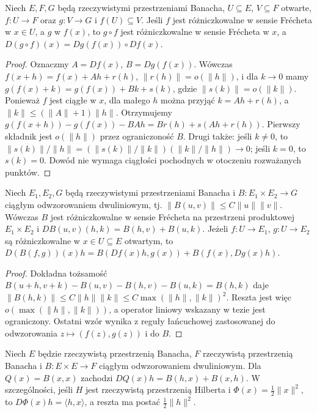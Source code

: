 \begin{twierdzenie}
\label{thm:chain14}
Niech $E,F,G$ będą rzeczywistymi przestrzeniami Banacha, $U\subseteq E$, $V\subseteq F$ otwarte, $f:U\to F$ oraz $g:V\to G$ i $f(U)\subseteq V$. Jeśli $f$ jest różniczkowalne w sensie Frécheta w $x\in U$, a $g$ w $f(x)$, to $g\circ f$ jest różniczkowalne w sensie Frécheta w $x$, a
$D(g\circ f)(x)=Dg(f(x))\circ Df(x)$.
\end{twierdzenie}
\begin{proof}
Oznaczmy $A=Df(x)$, $B=Dg(f(x))$. Wówczas $f(x+h)=f(x)+Ah+r(h)$, $\|r(h)\|=o(\|h\|)$, i dla $k\to0$ mamy $g(f(x)+k)=g(f(x))+Bk+s(k)$, gdzie $\|s(k)\|=o(\|k\|)$. Ponieważ $f$ jest ciągłe w $x$, dla małego $h$ można przyjąć $k=Ah+r(h)$, a $\|k\|\le(\|A\|+1)\|h\|$. Otrzymujemy
$g(f(x+h))-g(f(x))-BAh=Br(h)+s(Ah+r(h))$.
Pierwszy składnik jest $o(\|h\|)$ przez ograniczoność $B$. Drugi także: jeśli $k\ne0$, to
$\|s(k)\|/\|h\|=(\|s(k)\|/\|k\|)(\|k\|/\|h\|)\to0$;
jeśli $k=0$, to $s(k)=0$. Dowód nie wymaga ciągłości pochodnych w otoczeniu rozważanych punktów.
\end{proof}

\begin{twierdzenie}
\label{thm:bilinear14}
Niech $E_1,E_2,G$ będą rzeczywistymi przestrzeniami Banacha i $B:E_1\times E_2\to G$ ciągłym odwzorowaniem dwuliniowym, tj. $\|B(u,v)\|\le C\|u\|\|v\|$. Wówczas $B$ jest różniczkowalne w sensie Frécheta na przestrzeni produktowej $E_1\times E_2$ i
$DB(u,v)(h,k)=B(h,v)+B(u,k)$.
Jeżeli $f:U\to E_1$, $g:U\to E_2$ są różniczkowalne w $x\in U\subseteq E$ otwartym, to
$D(B(f,g))(x)h=B(Df(x)h,g(x))+B(f(x),Dg(x)h)$.
\end{twierdzenie}
\begin{proof}
Dokładna tożsamość
$B(u+h,v+k)-B(u,v)-B(h,v)-B(u,k)=B(h,k)$
daje $\|B(h,k)\|\le C\|h\|\|k\|\le C\max(\|h\|,\|k\|)^2$. Reszta jest więc $o(\max(\|h\|,\|k\|))$, a operator liniowy wskazany w tezie jest ograniczony. Ostatni wzór wynika z reguły łańcuchowej zastosowanej do odwzorowania $z\mapsto(f(z),g(z))$ i do $B$.
\end{proof}

\begin{przyklad}
\label{ex:quadratic14}
Niech $E$ będzie rzeczywistą przestrzenią Banacha, $F$ rzeczywistą przestrzenią Banacha i $B:E\times E\to F$ ciągłym odwzorowaniem dwuliniowym. Dla $Q(x)=B(x,x)$ zachodzi
$DQ(x)h=B(h,x)+B(x,h)$.
W szczególności, jeśli $H$ jest rzeczywistą przestrzenią Hilberta i $\Phi(x)=\frac12\|x\|^2$, to
$D\Phi(x)h=\langle h,x\rangle$, a reszta ma postać $\frac12\|h\|^2$.
\end{przyklad}

